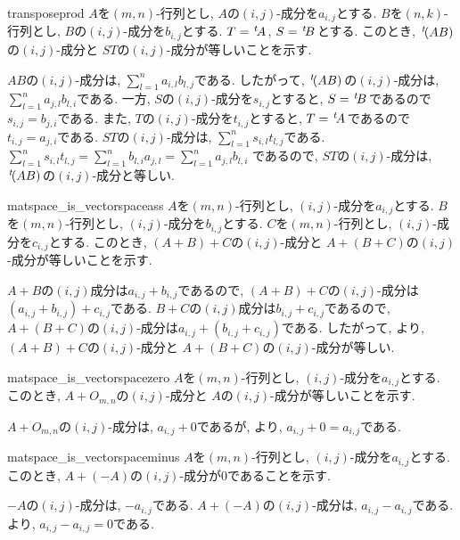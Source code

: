 \begin{proofof*}{transpose}{prod}
  $A$を$(m,n)$-行列とし, 
  $A$の$(i,j)$-成分を$a_{i,j}$とする.
  $B$を$(n,k)$-行列とし, 
  $B$の$(i,j)$-成分を$b_{i,j}$とする.
  $T={\left.^{t}\!A\right.}$, $S={\left.^{t}\!B\right.}$とする.
  このとき, ${\left.^{t}\!(AB)\right.}$の$(i,j)$-成分と
  $ST$の$(i,j)$-成分が等しいことを示す.

  $AB$の$(i,j)$-成分は, $\sum_{l=1}^{n} a_{i,l}b_{l,j}$である.
  したがって,
  ${\left.^{t}\!(AB)\right.}$の$(i,j)$-成分は, $\sum_{l=1}^{n} a_{j,l}b_{l,i}$である.
  一方,
  $S$の$(i,j)$-成分を$s_{i,j}$とすると,
  $S={\left.^{t}\!B\right.}$であるので
  $s_{i,j}=b_{j,i}$である.
  また, 
  $T$の$(i,j)$-成分を$t_{i,j}$とすると,
  $T={\left.^{t}\!A\right.}$であるので
  $t_{i,j}=a_{j,i}$である.
  $ST$の$(i,j)$-成分は,
  $\sum_{l=1}^{n}s_{i,l}t_{l,j}$である.
  $\sum_{l=1}^{n}s_{i,l}t_{l,j}=\sum_{l=1}^{n}b_{l,i}a_{j,l}=\sum_{l=1}^{n}a_{j,l}b_{l,i}$
  であるので,
  $ST$の$(i,j)$-成分は, ${\left.^{t}\!(AB)\right.}$の$(i,j)$-成分と等しい.
\end{proofof*}


\begin{proofof*}{matspace_is_vectorspace}{ass}
  $A$を$(m,n)$-行列とし, $(i,j)$-成分を$a_{i,j}$とする.
  $B$を$(m,n)$-行列とし, $(i,j)$-成分を$b_{i,j}$とする.
  $C$を$(m,n)$-行列とし, $(i,j)$-成分を$c_{i,j}$とする.
  このとき,
  $(A+B)+C$の$(i,j)$-成分と
  $A+(B+C)$の$(i,j)$-成分が等しいことを示す.

  $A+B$の$(i,j)$成分は$a_{i,j}+b_{i,j}$であるので,
  $(A+B)+C$の$(i,j)$-成分は$(a_{i,j}+b_{i,j})+c_{i,j}$である.
  $B+C$の$(i,j)$成分は$b_{i,j}+c_{i,j}$であるので,
  $A+(B+C)$の$(i,j)$-成分は$a_{i,j}+(b_{i,j}+c_{i,j})$である.
  したがって, より,
  $(A+B)+C$の$(i,j)$-成分と
  $A+(B+C)$の$(i,j)$-成分が等しい.
  
  
\end{proofof*}

\begin{proofof*}{matspace_is_vectorspace}{zero}
  $A$を$(m,n)$-行列とし, $(i,j)$-成分を$a_{i,j}$とする.
  このとき,
  $A+O_{m,n}$の$(i,j)$-成分と
  $A$の$(i,j)$-成分が等しいことを示す.

  $A+O_{m,n}$の$(i,j)$-成分は, $a_{i,j}+0$であるが,
  より,
  $a_{i,j}+0=a_{i,j}$である.
\end{proofof*}

\begin{proofof*}{matspace_is_vectorspace}{minus}
  $A$を$(m,n)$-行列とし, $(i,j)$-成分を$a_{i,j}$とする.
  このとき,
  $A+(-A)$の$(i,j)$-成分が$0$であることを示す.

  $-A$の$(i,j)$-成分は, $-a_{i,j}$である.
  $A+(-A)$の$(i,j)$-成分は, $a_{i,j}-a_{i,j}$である.
  より,
  $a_{i,j}-a_{i,j}=0$である.
\end{proofof*}

